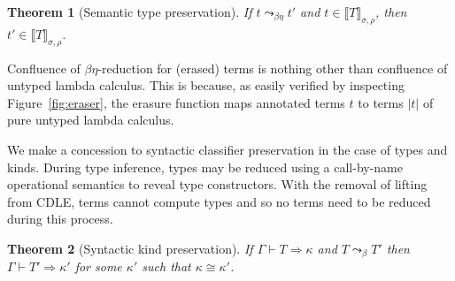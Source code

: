 \documentclass{article}
\newcommand{\interp}[1]{\llbracket #1 \rrbracket}
\newcommand{\tpsynth}[0]{\Rightarrow}
\newtheorem{theorem}{Theorem}
\newtheorem{lemma}[theorem]{Lemma}
\begin{document}
  \begin{theorem}[Semantic type preservation]
    If $t \leadsto_{\beta\eta} t'$ and $t\in\interp{T}_{\sigma,\rho}$, then $t'\in\interp{T}_{\sigma,\rho}$.
    \end{theorem}

  Confluence of $\beta\eta$-reduction for (erased)
  terms is nothing other than confluence of untyped lambda calculus.
  This is because, as easily verified by inspecting
  Figure~\ref{fig:eraser}, the erasure function maps annotated terms
  $t$ to terms $|t|$ of pure untyped lambda calculus.
\begin{comment}
  \begin{lemma}
    If $t$ is an annotated term of CDLE, then $|t|$ is a term of pure untyped lambda calculus.
    \end{lemma}
\end{comment}    

We make a concession to syntactic classifier preservation in the case of types
and kinds.
During type inference, types may be reduced using a call-by-name operational
semantics to reveal type constructors.
With the removal of lifting from CDLE, terms cannot compute types and so no
terms need to be reduced during this process.

\begin{theorem}[Syntactic kind preservation]
  \label{thm:syntactic-kind-pres}
  If \(\Gamma \vdash T \tpsynth \kappa\) and \(T \leadsto_{\beta} T'\) then
  \(\Gamma \vdash T' \tpsynth \kappa'\) for some \(\kappa'\) such that \(\kappa
  \cong \kappa'\).
\end{theorem}
\end{document}

